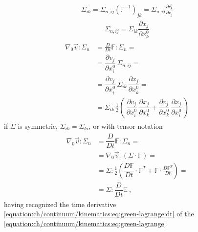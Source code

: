 \documentclass[letterpaper,10pt,english]{jupyterBook}
\begin{document}
\begin{equation*}
\end{equation*}\begin{equation*}
\begin{split}\Sigma_{ik} = \Sigma_{n, ij} \left( \mathbb{F}^{-1} \right)_{jk} = \Sigma_{n, ij} \frac{\partial r^0_k}{\partial r_j}\end{split}
\end{equation*}\begin{equation*}
\begin{split}\Sigma_{n, ij} = \Sigma_{ik} \dfrac{\partial x_j}{\partial x^0_k}\end{split}
\end{equation*}\begin{equation*}
\begin{split}\begin{aligned}
  \nabla_0 \vec{v} : \mathbb{\Sigma}_n 
  & = \frac{D}{Dt} \mathbb{F} : \mathbb{\Sigma}_n = \\
  & = \dfrac{\partial v_j}{\partial x^0_i} \, \Sigma_{n, ij} = \\
  & = \dfrac{\partial v_j}{\partial x^0_i} \, \Sigma_{ik} \, \dfrac{\partial x_j}{\partial x^0_k} = \\
  & = \Sigma_{ik} \, \frac{1}{2} \left( \, \dfrac{\partial v_j}{\partial x^0_i} \, \dfrac{\partial x_j}{\partial x^0_k} + \dfrac{\partial v_j}{\partial x^0_k} \, \dfrac{\partial x_j}{\partial x^0_i} \, \right)
\end{aligned}\end{split}
\end{equation*}
\sphinxAtStartPar
if \(\mathbb{\Sigma}\) is symmetric, \(\Sigma_{ik} = \Sigma_{ki}\), or with tensor notation
\begin{equation*}
\begin{split}\begin{aligned}
  \nabla_0 \vec{v} : \mathbb{\Sigma}_n
  & = \dfrac{D}{D t} \mathbb{F} : \mathbb{\Sigma}_n = \\
  & = \nabla_0 \vec{v} : \left( \mathbb{\Sigma} \cdot \mathbb{F} \right) = \\
  & = \mathbb{\Sigma} : \frac{1}{2} \left( \dfrac{D \mathbb{F}}{D t} \cdot \mathbb{F}^T + \mathbb{F} \cdot \frac{D \mathbb{F}^T}{D t}  \right) = \\
  & = \mathbb{\Sigma} : \dfrac{D}{Dt} \mathbb{E} \ ,
\end{aligned}\end{split}
\end{equation*}
\sphinxAtStartPar
having recognized the time derivative \eqref{equation:ch/continuum/kinematics:eq:green-lagrange:dt} of the {\hyperref[\detokenize{ch/continuum/kinematics:kinematics-reference-space-strain-green-lagrange}]{}} \eqref{equation:ch/continuum/kinematics:eq:green-lagrange}.
\end{document}
